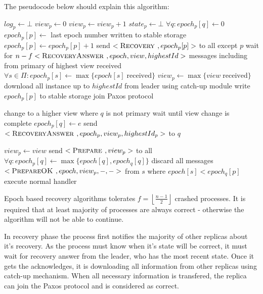 The pseudocode below should explain this algorithm:
\begin{algorithmic}[1]
  \INIT{}
    \STATE $log_p \leftarrow \bot$ %
    \STATE $view_p \leftarrow 0$
      \STATE $view_p \leftarrow view_p + 1$
    \ENDIF
    \STATE $state_p \leftarrow \bot$ %
    \STATE $\forall q : epoch_p[q] \leftarrow 0$
    \STATE
      \STATE $epoch_p[p] \leftarrow$ last epoch number written to stable storage
      \STATE $epoch_p[p] \leftarrow epoch_p[p] + 1$
      \STATE send $<\textsc{Recovery }, epoch_p[p]>$ to all except $p$
      \STATE wait for $n-f <\textsc{RecoveryAnswer }, epoch, view, highestId>$ messages including from primary of highest view received
      \STATE $\forall s \in \Pi : epoch_p[s] \leftarrow \max\{{epoch[s] \; \mathrm{ received}}\}$
      \STATE $view_p \leftarrow \max\{{ view \; \mathrm{received}}\}$
      \STATE download all instance up to $highestId$ from leader using catch-up module
    \ENDIF
      \STATE write $epoch_p[p]$ to stable storage
    \STATE
    \STATE join Paxos protocol
  \ENDINIT

  \vspace{1em}
      \STATE change to a higher view where $q$ is not primary
      \STATE wait until view change is complete
    \ENDIF
    \STATE $epoch_p[q] \leftarrow e$
    \STATE send $<\textsc{RecoveryAnswer }, epoch_p, view_p, highestId_p>$ to $q$
  \ENDUPON

  \vspace{1em}
      \STATE $view_p \leftarrow view$
      \STATE send $<\textsc{Prepare }, view_p>$ to all
    \ELSE
      \STATE $\forall q : epoch_p[q] \leftarrow \max\{{epoch[q], epoch_q[q]}\}$
        \STATE discard all messages $<\textsc{PrepareOK }, epoch, view_p, -, ->$ from $s$ where $epoch[s] < epoch_q[p]$
      \ENDFOR
      \STATE execute normal handler 
    \ENDIF
  \ENDUPON
\end{algorithmic}

Epoch based recovery algorithms tolerates $f = \left\lfloor \frac{n-1}{2} \right\rfloor $ crashed processes. It is required that at least majority of processes are always correct - otherwise the algorithm will not be able to continue.

In recovery phase the process first notifies the majority of other replicas about it's recovery. As the process must know when it's state will be correct, it must wait for recovery answer from the leader, who has the most recent state. Once it gets the acknowledges, it is downloading all information from other replicas using catch-up mechanism.  When all necessary information is transfered, the replica can join the Paxos protocol and is considered as correct.

